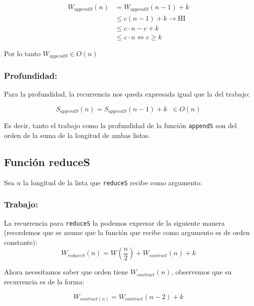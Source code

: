 \documentclass[11pt]{article}
\begin{document}
\begin{align*}
    W_{appendS}(n) & = W_{appendS}(n - 1) + k \\
             & \leq c(n - 1) + k \rightarrow \text{HI}\\
             & \leq c \cdot n - c + k \\
             & \leq c \cdot n \iff c \geq k
\end{align*}

Por lo tanto $W_{appendS} \in O(n)$ \\

\subsubsection{Profundidad:}

Para la profundidad, la recurrencia nos queda expresada igual que la del
trabajo:

\begin{equation*}
    S_{appendS}(n) = S_{appendS}(n - 1) + k \; \; \in O(n)
\end{equation*}

Es decir, tanto el trabajo como la profundidad de la función \texttt{appendS}
son del orden de la suma de la longitud de ambas listas.


\subsection{Función reduceS}
Sea $n$ la longitud de la lista que \texttt{reduceS} recibe como argumento.
\subsubsection{Trabajo:}

La recurrencia para \texttt{reduceS} la podemos expresar de la siguiente manera
(recordemos que se asume que la función que recibe como argumento es de orden constante):
\begin{equation*}
    W_{reduceS}(n) = W(\frac{n}{2}) + W_{contract}(n) + k
\end{equation*}

Ahora necesitamos saber que orden tiene $W_{contract}(n)$, observemos que su 
recurrencia es de la forma:

\begin{equation*}
    W_{contract(n)} = W_{contract}(n-2) + k 
\end{equation*}
\end{document}
